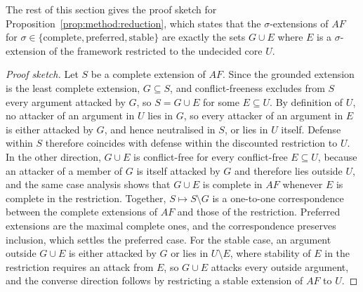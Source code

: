The rest of this section gives the proof sketch for
Proposition~\ref{prop:method:reduction}, which states that the
$\sigma$-extensions of $AF$ for
$\sigma \in \{\text{complete}, \text{preferred}, \text{stable}\}$ are exactly
the sets $G \cup E$ where $E$ is a $\sigma$-extension of the framework
restricted to the undecided core $U$.

\begin{proof}[Proof sketch]
Let $S$ be a complete extension of $AF$. Since the grounded extension is the
least complete extension, $G \subseteq S$, and conflict-freeness excludes from
$S$ every argument attacked by $G$, so $S = G \cup E$ for some $E \subseteq U$.
By definition of $U$, no attacker of an argument in $U$ lies in $G$, so every
attacker of an argument in $E$ is either attacked by $G$, and hence neutralised
in $S$, or lies in $U$ itself. Defense within $S$ therefore coincides with
defense within the discounted restriction to $U$. In the other direction,
$G \cup E$ is conflict-free for every conflict-free $E \subseteq U$, because an
attacker of a member of $G$ is itself attacked by $G$ and therefore lies
outside $U$, and the same case analysis shows that $G \cup E$ is complete in
$AF$ whenever $E$ is complete in the restriction. Together,
$S \mapsto S \setminus G$
is a one-to-one correspondence between the complete extensions of $AF$ and
those of the restriction. Preferred extensions are the maximal complete ones,
and the correspondence preserves inclusion, which settles the preferred case.
For the stable case, an argument outside $G \cup E$ is either attacked by $G$
or lies in $U \setminus E$, where stability of $E$ in the restriction requires
an attack from $E$, so $G \cup E$ attacks every outside argument, and the
converse direction follows by restricting a stable extension of $AF$ to $U$.
\end{proof}
